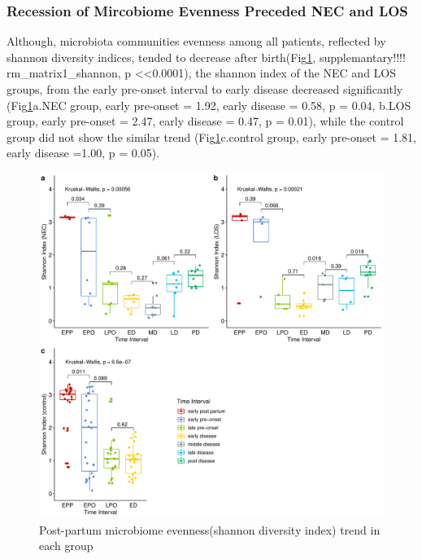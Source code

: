 \documentclass[fleqn,10pt,lineno]{wlpeerj} %
\begin{document}
    \subsubsection*{Recession of Mircobiome Evenness Preceded NEC and LOS}
    Although, microbiota communities evenness among all patients, reflected by shannon diversity indices, tended to decrease after birth(Fig\ref{fig:shannon-group-time}, supplemantary!!!! rm\_matrix1\_shannon, p \textless <0.0001), the shannon index of the NEC and LOS groups, from the early pre-onset interval to early disease decreased significantly (Fig\ref{fig:shannon-group-time}a.NEC group, early pre-onset = 1.92, early disease = 0.58, p = 0.04, b.LOS group, early pre-onset = 2.47, early disease = 0.47, p = 0.01), while the control group did not show the similar trend (Fig\ref{fig:shannon-group-time}c.control group, early pre-onset = 1.81, early disease =1.00, p = 0.05).
    \begin{figure}[ht]\centering
      \includegraphics[width=\linewidth]{figure/shannon-group-time.pdf}
      \caption{Post-partum microbiome evenness(shannon diversity index) trend in each group}
      \label{fig:shannon-group-time}
    \end{figure}
\end{document}

